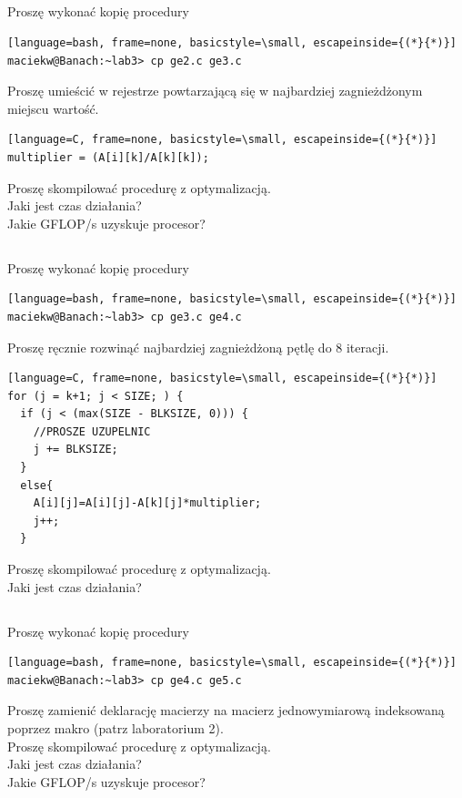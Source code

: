\documentclass[12pt,a4paper]{article}
\begin{document}
\subsection{}

Proszę wykonać kopię procedury
\begin{lstlisting}[language=bash, frame=none, basicstyle=\small, escapeinside={(*}{*)}]
maciekw@Banach:~lab3> cp ge2.c ge3.c
\end{lstlisting}
Proszę umieścić w rejestrze powtarzającą się w najbardziej zagnieżdżonym miejscu wartość.
\begin{lstlisting}[language=C, frame=none, basicstyle=\small, escapeinside={(*}{*)}]
multiplier = (A[i][k]/A[k][k]);
\end{lstlisting}
Proszę skompilować procedurę z optymalizacją.\\
Jaki jest czas działania?\\
Jakie GFLOP/s uzyskuje procesor?

\subsection{}

Proszę wykonać kopię procedury
\begin{lstlisting}[language=bash, frame=none, basicstyle=\small, escapeinside={(*}{*)}]
maciekw@Banach:~lab3> cp ge3.c ge4.c
\end{lstlisting}
Proszę ręcznie rozwinąć najbardziej zagnieżdżoną pętlę do 8 iteracji.
\begin{lstlisting}[language=C, frame=none, basicstyle=\small, escapeinside={(*}{*)}]
for (j = k+1; j < SIZE; ) {
  if (j < (max(SIZE - BLKSIZE, 0))) {
    //PROSZE UZUPELNIC
    j += BLKSIZE;
  }
  else{
    A[i][j]=A[i][j]-A[k][j]*multiplier;
    j++;
  }
\end{lstlisting}
Proszę skompilować procedurę z optymalizacją.\\
Jaki jest czas działania?

\subsection{}

Proszę wykonać kopię procedury
\begin{lstlisting}[language=bash, frame=none, basicstyle=\small, escapeinside={(*}{*)}]
maciekw@Banach:~lab3> cp ge4.c ge5.c
\end{lstlisting}
Proszę zamienić deklarację macierzy na macierz jednowymiarową indeksowaną poprzez makro (patrz laboratorium 2).\\
Proszę skompilować procedurę z optymalizacją.\\
Jaki jest czas działania?\\
Jakie GFLOP/s uzyskuje procesor?
\end{document}
